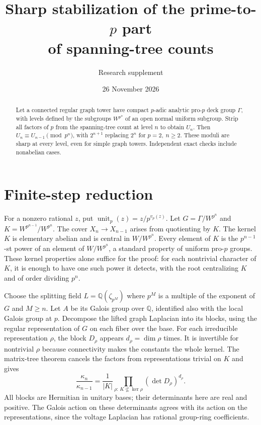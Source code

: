 \documentclass[11pt]{article}
\title{\vspace{-1.8em}Sharp stabilization of the prime-to-\(p\) part\\ of spanning-tree counts}
\author{Research supplement}
\date{26 November 2026}
\newcommand{\Q}{\mathbb Q}
\newcommand{\up}{\operatorname{unit}_p}
\begin{document}
\maketitle
\begin{abstract}
Let a connected regular graph tower have compact \(p\)-adic analytic
pro-\(p\) deck group \(\Gamma\), with levels defined by the subgroups
\(W^{p^n}\) of an open normal uniform subgroup. Strip all factors of
\(p\) from the spanning-tree count at level \(n\) to obtain \(U_n\).
Then \(U_n\equiv U_{n-1}\pmod{p^n}\), with \(2^{n+1}\) replacing \(2^n\)
for \(p=2,\ n\ge2\). These moduli are sharp at every level, even for
simple graph towers. Independent exact checks include nonabelian cases.
\end{abstract}

\section{Finite-step reduction}
For a nonzero rational \(z\), put \(\up(z)=z/p^{v_p(z)}\).
Let \(G=\Gamma/W^{p^n}\) and \(K=W^{p^{n-1}}/W^{p^n}\).
The cover \(X_n\to X_{n-1}\) arises from quotienting by \(K\).
The kernel \(K\) is elementary abelian and is central in \(W/W^{p^n}\).
Every element of \(K\) is the \(p^{n-1}\)-st power of an element of
\(W/W^{p^n}\), a standard property of uniform pro-\(p\) groups.
These kernel properties alone suffice for the proof: for each nontrivial
character of \(K\), it is enough to have one such power it detects,
with the root centralizing \(K\) and of order dividing \(p^n\).

Choose the splitting field \(L=\Q(\zeta_{p^M})\) where \(p^M\) is
a multiple of the exponent of \(G\) and \(M\ge n\). Let \(A\) be its
Galois group over \(\Q\), identified also with the local Galois group
at \(p\). Decompose the lifted graph Laplacian into its blocks, using
the regular representation of \(G\) on each fiber over the base.
For each irreducible representation \(\rho\), the block \(D_\rho\)
appears \(d_\rho=\dim\rho\) times. It is invertible for nontrivial
\(\rho\) because connectivity makes the constants the whole kernel.
The matrix-tree theorem cancels the factors from representations
trivial on \(K\) and gives
\[
 \frac{\kappa_n}{\kappa_{n-1}}=
 \frac{1}{|K|}\prod_{\rho:\,K\not\subseteq\ker\rho}(\det D_\rho)^{d_\rho}.
\]
All blocks are Hermitian in unitary bases; their determinants here
are real and positive. The Galois action on these determinants agrees
with its action on the representations, since the voltage Laplacian
has rational group-ring coefficients.
\newpage
\end{document}
